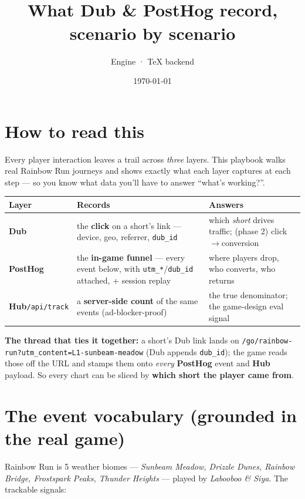 \documentclass[11pt]{article}
\title{\color{accent}\doctitle\\[2pt]\large\color{ink}\normalfont What \textcolor{dub}{Dub} \& \textcolor{ph}{PostHog} record, scenario by scenario}
\author{Engine · TeX backend}
\date{\today}
\newcommand{\callout}[1]{\par\smallskip\noindent
  \colorbox{soft}{\parbox{\dimexpr\linewidth-2\fboxsep\relax}{\color{ink}#1}}\par\smallskip}
\newcommand{\Dub}{\textcolor{dub}{\textbf{Dub}}}
\newcommand{\PH}{\textcolor{ph}{\textbf{PostHog}}}
\newcommand{\Hub}{\textcolor{hub}{\textbf{Hub}}}
\begin{document}
\maketitle\thispagestyle{fancy}

\section{How to read this}
Every player interaction leaves a trail across \emph{three} layers. This playbook walks real
Rainbow Run journeys and shows exactly what each layer captures at each step --- so you know what
data you'll have to answer ``what's working?''.

\begin{center}\small
\begin{tabular}{@{}P{2.4cm}P{5.0cm}P{7.1cm}@{}}
\toprule
Layer & Records & Answers \\
\midrule
\Dub & the \textbf{click} on a short's link --- device, geo, referrer, \texttt{dub\_id} & which \emph{short} drives traffic; (phase 2) click$\to$conversion \\
\PH & the \textbf{in-game funnel} --- every event below, with \texttt{utm\_*}/\texttt{dub\_id} attached, + session replay & where players drop, who converts, who returns \\
\Hub \texttt{/api/track} & a \textbf{server-side count} of the same events (ad-blocker-proof) & the true denominator; the game-design eval signal \\
\bottomrule
\end{tabular}
\end{center}

\callout{\textbf{The thread that ties it together:} a short's Dub link lands on
\texttt{/go/rainbow-run?utm\_content=L1-sunbeam-meadow} (Dub appends \texttt{dub\_id}); the game
reads those off the URL and stamps them onto \emph{every} \PH{} event and \Hub{} payload. So every
chart can be sliced by \textbf{which short the player came from}.}

\section{The event vocabulary (grounded in the real game)}
Rainbow Run is 5 weather biomes --- \emph{Sunbeam Meadow, Drizzle Dunes, Rainbow Bridge,
Frostspark Peaks, Thunder Heights} --- played by \emph{Labooboo \& Siya}. The trackable signals:
\end{document}
